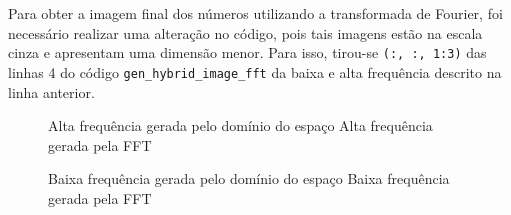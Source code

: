Para obter a imagem final dos números utilizando a transformada de Fourier, foi necessário realizar uma alteração no código, pois tais imagens estão na escala cinza e apresentam uma dimensão menor. Para isso, tirou-se \texttt{(:, :, 1:3)} das linhas 4 do código \texttt{gen\_hybrid\_image\_fft} da baixa e alta frequência descrito na linha anterior.

\begin{figure}[ht]
	\centering
	\caption[]{  Alta frequência gerada pelo domínio do espaço  Alta frequência gerada pela FFT}
	\label{fig:altasNum}
\end{figure}


 \begin{figure}[ht]
 	\centering
 	\caption[]{  Baixa frequência gerada pelo domínio do espaço  Baixa frequência gerada pela FFT}
 	\label{fig:baixasNum}
 \end{figure}


